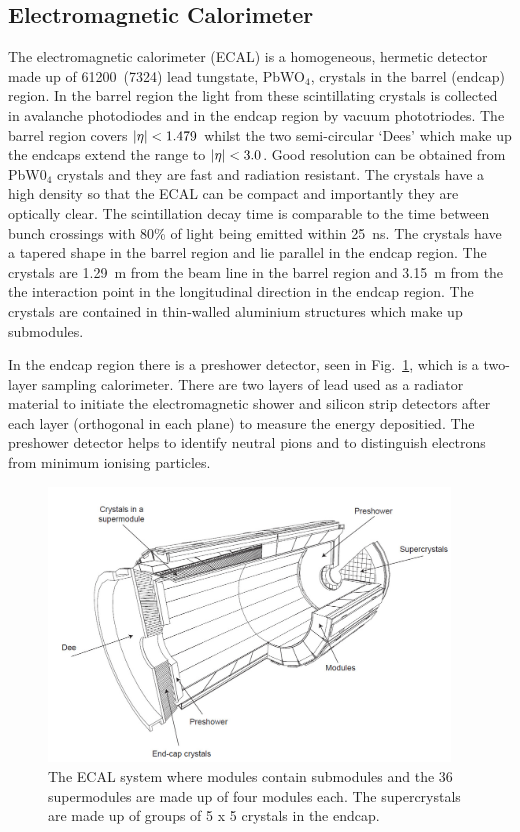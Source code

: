 \subsection{Electromagnetic Calorimeter}

The electromagnetic calorimeter (ECAL) is a homogeneous, hermetic detector made up of 61200~(7324) lead tungstate, PbWO$_{4}$, crystals in the barrel (endcap) region. In the barrel region the light from these scintillating crystals is collected in avalanche photodiodes and in the endcap region by vacuum phototriodes. The barrel region covers $\lvert \eta \rvert<1.479$ whilst the two semi-circular `Dees' which make up the endcaps extend the range to $\lvert \eta \rvert<3.0$. Good resolution can be obtained from PbW0$_{4}$ crystals and they are fast and radiation resistant. The crystals have a high density so that the ECAL can be compact and importantly they are optically clear. The scintillation decay time is comparable to the time between bunch crossings with 80\% of light being emitted within 25~ns. The crystals have a tapered shape in the barrel region and lie parallel in the endcap region. The crystals are 1.29~m from the beam line in the barrel region and 3.15~m from the the interaction point in the longitudinal direction in the endcap region. The crystals are contained in thin-walled aluminium structures which make up submodules.

In the endcap region there is a preshower detector, seen in Fig.~\ref{fig:ecal}, which is a two-layer sampling calorimeter. There are two layers of lead used as a radiator material to initiate the electromagnetic shower and silicon strip detectors after each layer (orthogonal in each plane) to measure the energy depositied. The preshower detector helps to identify neutral pions and to distinguish electrons from minimum ionising particles.

\begin{figure}[ht!]
\centering
    \includegraphics[width=0.95\textwidth]{images/ecal.png}
    \caption{The ECAL system where modules contain submodules and the 36 supermodules are made up of four modules each. The supercrystals are made up of groups of 5 x 5 crystals in the endcap.}
    \label{fig:ecal}
\end{figure}


